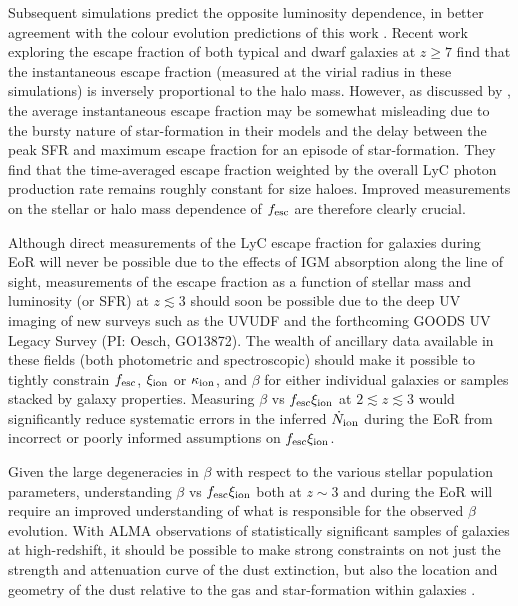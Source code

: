 Subsequent simulations predict the opposite luminosity dependence, in better agreement with the colour evolution predictions of this work \citep{Razoumov:2010bh,Yajima:2010fb}. Recent work exploring the escape fraction of both typical \citep{Kimm:2014gv} and dwarf \citep{Wise:2014kt} galaxies at $z\geq7$ find that the instantaneous escape fraction (measured at the virial radius in these simulations) is inversely proportional to the halo mass. However, as discussed by \citet{Kimm:2014gv}, the average instantaneous escape fraction may be somewhat misleading due to the bursty nature of star-formation in their models and the delay between the peak SFR and maximum escape fraction for an episode of star-formation. They find that the time-averaged escape fraction weighted by the overall LyC photon production rate remains roughly constant for size haloes. Improved measurements on the stellar or halo mass dependence of $f_{\rm{esc}}$ are therefore clearly crucial.

Although direct measurements of the LyC escape fraction for galaxies during EoR will never be possible due to the effects of IGM absorption along the line of sight, measurements of the escape fraction as a function of stellar mass and luminosity (or SFR) at $z \lesssim 3$ should soon be possible due to the deep UV imaging of new surveys such as the UVUDF \citep{Teplitz:2013jg} and the forthcoming GOODS UV Legacy Survey (PI: Oesch, GO13872). The wealth of ancillary data available in these fields (both photometric and spectroscopic) should make it possible to tightly constrain $f_{\rm{esc}}$, $\xi_{\rm{ion}}$ or $\kappa_{\rm{ion}}$, and $\beta$ for either individual galaxies or samples stacked by galaxy properties. Measuring $\beta$ vs $f_{\rm{esc}}\xi_{\rm{ion}}$ at $2 \lesssim z \lesssim 3$ would significantly reduce systematic errors in the inferred $\dot{N}_{\rm{ion}}$ during the EoR from incorrect or poorly informed assumptions on $f_{\rm{esc}}\xi_{\rm{ion}}$.

Given the large degeneracies in $\beta$ with respect to the various stellar population parameters, understanding  $\beta$ vs $f_{\rm{esc}}\xi_{\rm{ion}}$ both at $z\sim3$ and during the EoR will require an improved understanding of what is responsible for the observed $\beta$ evolution. With ALMA observations of statistically significant samples of galaxies at high-redshift, it should be possible to make strong constraints on not just the strength and attenuation curve of the dust extinction, but also the location and geometry of the dust relative to the gas and star-formation within galaxies \citep{DeBreuck:2014eo}. 

